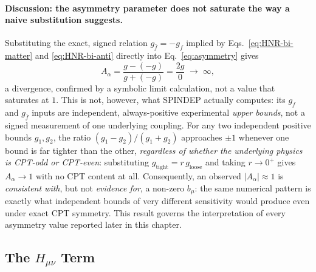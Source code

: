 \paragraph{Discussion: the asymmetry parameter does not saturate the way a
naive substitution suggests.} Substituting the exact, signed relation
$g_{\bar f}=-g_f$ implied by Eqs.~\eqref{eq:HNR-bi-matter} and
\eqref{eq:HNR-bi-anti} directly into Eq.~\eqref{eq:asymmetry} gives
\begin{equation}
  A_\alpha = \frac{g-(-g)}{g+(-g)} = \frac{2g}{0} \;\longrightarrow\; \infty,
  \label{eq:Aalpha-divergence}
\end{equation}
a divergence, confirmed by a symbolic limit calculation, not a
value that saturates at $1$. This is not, however, what SPINDEP actually
computes: its $g_f$ and $g_{\bar f}$ inputs are independent,
always-positive experimental \emph{upper bounds}, not a signed measurement
of one underlying coupling. For any two independent positive bounds
$g_1,g_2$, the ratio $(g_1-g_2)/(g_1+g_2)$ approaches $\pm1$ whenever one
bound is far tighter than the other, \emph{regardless of whether the
underlying physics is CPT-odd or CPT-even}: substituting
$g_{\text{tight}}=r\,g_{\text{loose}}$ and taking $r\to0^+$ gives
$A_\alpha\to1$ with no CPT content at all. Consequently, an observed
$|A_\alpha|\approx1$ is \emph{consistent with}, but not \emph{evidence
for}, a non-zero $b_\mu$: the same numerical pattern is exactly what
independent bounds of very different sensitivity would produce even under
exact CPT symmetry. This result governs the interpretation of every
asymmetry value reported later in this chapter.

\subsection{The \texorpdfstring{$H_{\mu\nu}$}{H\_mu\_nu} Term}

